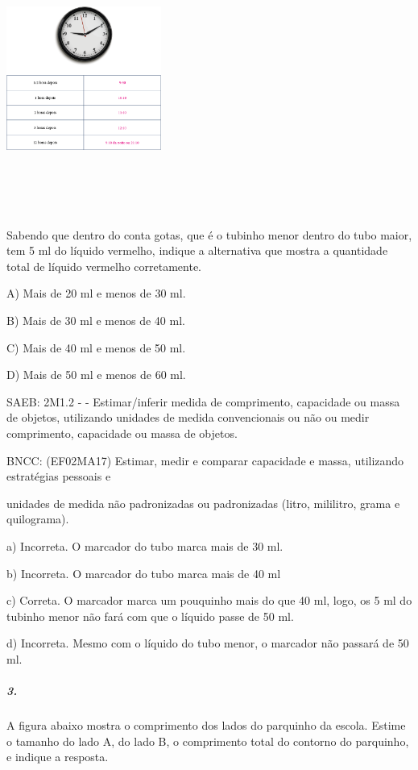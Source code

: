 \includegraphics[width=2.00003in,height=3.45840in]{media/image56.png}

Sabendo que dentro do conta gotas, que é o tubinho menor dentro do tubo
maior, tem 5 ml do líquido vermelho, indique a alternativa que mostra a
quantidade total de líquido vermelho corretamente.

A) Mais de 20 ml e menos de 30 ml.

B) Mais de 30 ml e menos de 40 ml.

C) Mais de 40 ml e menos de 50 ml.

D) Mais de 50 ml e menos de 60 ml.

SAEB: 2M1.2 - - Estimar/inferir medida de comprimento, capacidade ou
massa de objetos, utilizando unidades de medida convencionais ou não ou
medir comprimento, capacidade ou massa de objetos.

BNCC: (EF02MA17) Estimar, medir e comparar capacidade e massa,
utilizando estratégias pessoais e

unidades de medida não padronizadas ou padronizadas (litro, mililitro,
grama e quilograma).

a) Incorreta. O marcador do tubo marca mais de 30 ml.

b) Incorreta. O marcador do tubo marca mais de 40 ml

c) Correta. O marcador marca um pouquinho mais do que 40 ml, logo, os 5
ml do tubinho menor não fará com que o líquido passe de 50 ml.

d) Incorreta. Mesmo com o líquido do tubo menor, o marcador não passará
de 50 ml.

\subparagraph{3.}\label{section-41}

A figura abaixo mostra o comprimento dos lados do parquinho da escola.
Estime o tamanho do lado A, do lado B, o comprimento total do contorno
do parquinho, e indique a resposta.


